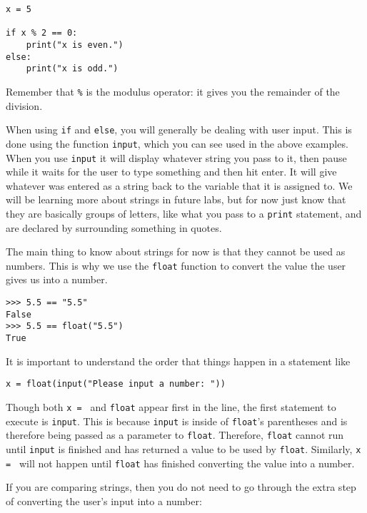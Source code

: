 \documentclass[11pt,hidelinks]{article}
\begin{document}
\begin{lstlisting}[style=python]
x = 5

if x % 2 == 0:
    print("x is even.")
else:
    print("x is odd.")
\end{lstlisting}

Remember that \lstinline!%! 
is the modulus operator: it gives you the remainder of the division.

When using \lstinline{if} and \lstinline{else}, you will generally be dealing
with user input. This is done using the function \lstinline{input}, which you
can see used in the above examples. When you use \lstinline{input} it will
display whatever string you pass to it, then pause while it waits for the user
to type something and then hit enter. It will give whatever was entered as a
string back to the variable that it is assigned to. We will be learning more
about strings in future labs, but for now just know that they are basically
groups of letters, like what you pass to a \lstinline{print} statement, and are
declared by surrounding something in quotes.

The main thing to know about strings for now is that they cannot be used as
numbers. This is why we use the \lstinline{float} function to convert the value
the user gives us into a number.

\begin{lstlisting}[style=ipython]
>>> 5.5 == "5.5"
False
>>> 5.5 == float("5.5")
True
\end{lstlisting}

It is important to understand the order that things happen in a statement like

\lstinline{x = float(input("Please input a number: "))}

Though both \lstinline{x = } and \lstinline{float} appear first in the line, the
first statement to execute is \lstinline{input}. This is because
\lstinline{input} is inside of \lstinline{float}'s parentheses and is therefore
being passed as a parameter to \lstinline{float}. Therefore, \lstinline{float}
cannot run until \lstinline{input} is finished and has returned a value to be
used by \lstinline{float}. Similarly, \lstinline{x = } will not happen until
\lstinline{float} has finished converting the value into a number.

If you are comparing strings, then you do not need to go through the extra step
of converting the user's input into a number:
\end{document}
